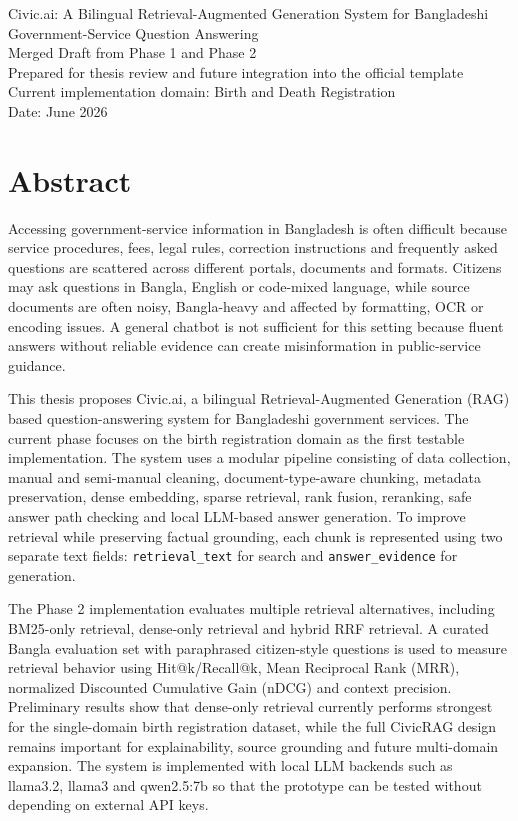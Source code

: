 \documentclass[12pt,oneside,openany]{report}
\begin{document}
\begin{titlepage}
\centering
{\Large Civic.ai: A Bilingual Retrieval-Augmented Generation System for Bangladeshi Government-Service Question Answering\\[1cm]}
{\large Merged Draft from Phase 1 and Phase 2\\[0.5cm]}
{\large Prepared for thesis review and future integration into the official template\\[2cm]}
{\large Current implementation domain: Birth and Death Registration\\[0.5cm]}
{\large Date: June 2026}
\end{titlepage}

{}
\section*{Abstract}

Accessing government-service information in Bangladesh is often difficult because service procedures, fees, legal rules, correction instructions and frequently asked questions are scattered across different portals, documents and formats. Citizens may ask questions in Bangla, English or code-mixed language, while source documents are often noisy, Bangla-heavy and affected by formatting, OCR or encoding issues. A general chatbot is not sufficient for this setting because fluent answers without reliable evidence can create misinformation in public-service guidance.

This thesis proposes Civic.ai, a bilingual Retrieval-Augmented Generation (RAG) based question-answering system for Bangladeshi government services. The current phase focuses on the birth registration domain as the first testable implementation. The system uses a modular pipeline consisting of data collection, manual and semi-manual cleaning, document-type-aware chunking, metadata preservation, dense embedding, sparse retrieval, rank fusion, reranking, safe answer path checking and local LLM-based answer generation. To improve retrieval while preserving factual grounding, each chunk is represented using two separate text fields: \texttt{retrieval\_text} for search and \texttt{answer\_evidence} for generation.

The Phase 2 implementation evaluates multiple retrieval alternatives, including BM25-only retrieval, dense-only retrieval and hybrid RRF retrieval. A curated Bangla evaluation set with paraphrased citizen-style questions is used to measure retrieval behavior using Hit@k/Recall@k, Mean Reciprocal Rank (MRR), normalized Discounted Cumulative Gain (nDCG) and context precision. Preliminary results show that dense-only retrieval currently performs strongest for the single-domain birth registration dataset, while the full CivicRAG design remains important for explainability, source grounding and future multi-domain expansion. The system is implemented with local LLM backends such as llama3.2, llama3 and qwen2.5:7b so that the prototype can be tested without depending on external API keys.
\end{document}
